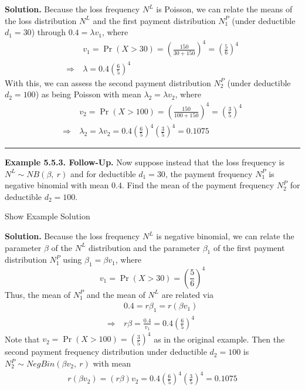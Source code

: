 \documentclass[]{book}
\theoremstyle{definition}
\theoremstyle{definition}
\theoremstyle{definition}
\theoremstyle{remark}
\begin{document}
\hypertarget{toggleExampleAggLoss.5.2}{}
\textbf{Solution.} Because the loss frequency \(N^L\) is Poisson, we can
relate the means of the loss distribution \(N^L\) and the first payment
distribution \(N^{P}_1\) (under deductible \(d_1=30\)) through
\(0.4 = \lambda v_1\), where \[\begin{aligned}
&v_1 = \Pr(X > 30) = \left( \frac{150}{30+150}\right)^4=\left( \frac{5}{6}\right)^4 \\
\Rightarrow \ & \lambda = 0.4 \left( \frac{6}{5} \right)^4
\end{aligned}\] With this, we can assess the second payment distribution
\(N^{P}_2\) (under deductible \(d_2=100\)) as being Poisson with mean
\(\lambda_2 = \lambda v_2\), where \[\begin{aligned}
& v_2 = \Pr(X>100)=\left( \frac{150}{100+150}\right)^4=\left( \frac{3}{5}\right)^4 \\
\Rightarrow \ & \lambda_2 = \lambda v_2 = 0.4\left( \frac{6}{5} \right)^4 \left( \frac{3}{5} \right)^4 = 0.1075
\end{aligned}\]

\begin{center}\rule{0.5\linewidth}{\linethickness}\end{center}

\textbf{Example 5.5.3. Follow-Up.} Now suppose instead that the loss
frequency is \(N^L \sim NB(\beta,\ r)\) and for deductible \(d_1=30\),
the payment frequency \(N^{P}_1\) is negative binomial with mean
\(0.4\). Find the mean of the payment frequency \(N^{P}_2\) for
deductible \(d_2=100\).

Show Example Solution

\hypertarget{toggleExampleAggLoss.5.3}{}
\textbf{Solution.} Because the loss frequency \(N^L\) is negative
binomial, we can relate the parameter \(\beta\) of the \(N^L\)
distribution and the parameter \(\beta_1\) of the first payment
distribution \(N^{P}_1\) using \(\beta_1 = \beta v_1\), where
\[v_1 = \Pr(X > 30) = \left( \frac{5}{6} \right)^4\] Thus, the mean of
\(N^{P}_1\) and the mean of \(N^L\) are related via \[\begin{aligned}
&0.4 =  r \beta_1 = r \left(\beta v_1\right) \\
\Rightarrow \ & r\beta = \frac{0.4}{v_1} = 0.4 \left(\frac{6}{5} \right)^4
\end{aligned}\] Note that
\(v_2 = \Pr(X > 100) = \left( \frac{3}{5}\right)^4\) as in the original
example. Then the second payment frequency distribution under deductible
\(d_2=100\) is \(N^{P}_2 \sim NegBin(\beta v_2, \ r)\) with mean
\[\begin{aligned}
r (\beta v_2) = (r \beta) v_2 = 0.4 \left( \frac{6}{5}\right)^4 \left( \frac{3}{5} \right)^4 = 0.1075
\end{aligned}\]
\end{document}
